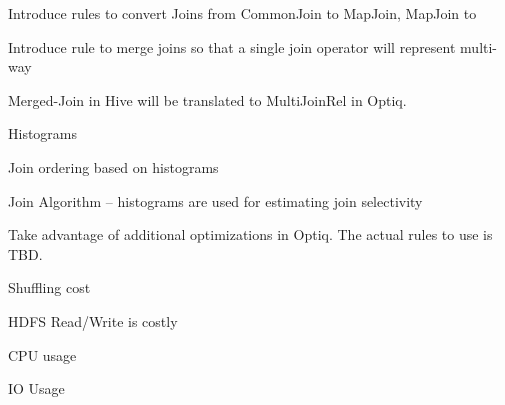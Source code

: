\documentclass{vldb}
\newcommand{\ii}{\item}
\begin{document}
\ii Introduce rules to convert Joins from CommonJoin to MapJoin, MapJoin to
\ii Introduce rule to merge joins so that a single join operator will represent multi-way
\ii Merged-Join in Hive will be translated to MultiJoinRel in Optiq.
\ii Histograms
\ii Join ordering based on histograms
\ii Join Algorithm – histograms are used for estimating join selectivity
\ii Take advantage of additional optimizations in Optiq. The actual rules to use is TBD.
\ii Shuffling cost
\ii HDFS Read/Write is costly
\ii CPU usage
\ii IO Usage
\end{document}
